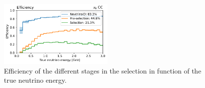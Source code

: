 \begin{figure}[H]
    \centering
    \includegraphics[width=0.5\textwidth]{NueCCsel/Images/run1/efficiency_all.pdf}
    \caption{Efficiency of the different stages in the selection in function of the true neutrino energy.}
    \label{fig:nueccinc_eff}
\end{figure}



